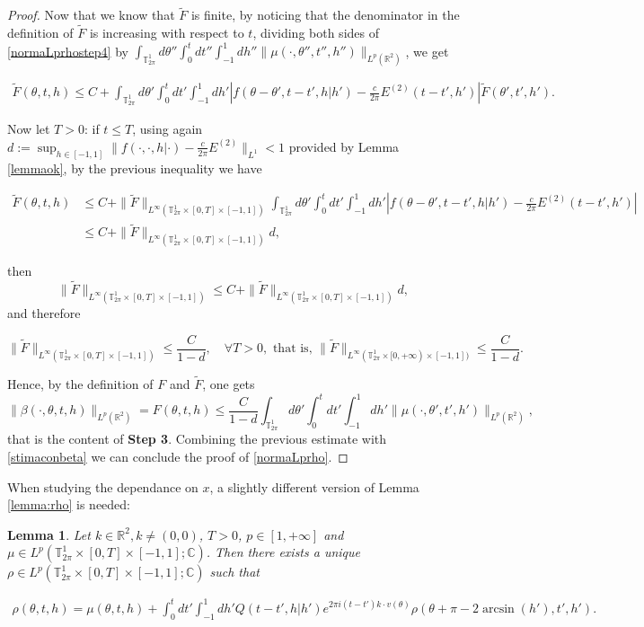\documentclass[a4paper,10pt,reqno]{amsart}
\newtheorem{lemma}{Lemma}[section]
\numberwithin{equation}{subsection}
\numberwithin{figure}{subsection}
\begin{document}
\begin{proof}
Now that we know that $\tilde F$ is finite, by noticing that the denominator in the definition of $\tilde F$ is increasing with respect to $t$, dividing both sides of \eqref{normaLprhostep4} by $\int_{\mathbb{T}^1_{2\pi}}d\theta''\int_0^tdt''\int_{-1}^1dh''\|\mu(\cdot,\theta'',t'',h'')\|_{L^p(\mathbb{R}^2)}$, we get

{\footnotesize\begin{align*}
\tilde F(\theta,t,h)\leq C+\int_{\mathbb{T}^1_{2\pi}}d\theta'\int_0^tdt'\int_{-1}^1dh' \left|f(\theta-\theta',t-t',h|h')-\frac{c}{2\pi}E^{(2)}(t-t',h')\right|\tilde F(\theta',t',h').
\end{align*}}

Now let $T>0$: if $t\leq T$, using again $d:=\sup_{h\in[-1,1]}\|f(\cdot,\cdot,h|\cdot)-\frac{c}{2\pi}E^{(2)}\|_{L^1}<1$ provided by Lemma \ref{lemmaok}, by the previous inequality we have

{\tiny\begin{align*}
\tilde F(\theta,t,h)&\leq C+\|\tilde F\|_{L^{\infty}(\mathbb{T}^1_{2\pi}\times[0,T]\times[-1,1])}\int_{\mathbb{T}^1_{2\pi}}d\theta'\int_0^tdt'\int_{-1}^1dh' \left|f(\theta-\theta',t-t',h|h')-\frac{c}{2\pi}E^{(2)}(t-t',h')\right|
\\
&\leq C+\|\tilde F\|_{L^{\infty}(\mathbb{T}^1_{2\pi}\times[0,T]\times[-1,1])}d,
\end{align*}}

then
\[
\|\tilde F\|_{L^{\infty}(\mathbb{T}^1_{2\pi}\times[0,T]\times[-1,1])}\leq C+\|\tilde F\|_{L^{\infty}(\mathbb{T}^1_{2\pi}\times[0,T]\times[-1,1])}d,
\]
and therefore

{\small\[
\|\tilde F\|_{L^{\infty}(\mathbb{T}^1_{2\pi}\times[0,T]\times[-1,1])}\leq\frac{C}{1-d},\quad\forall T>0,\textrm{ that is, }\|\tilde F\|_{L^{\infty}(\mathbb{T}^1_{2\pi}\times[0,+\infty)\times[-1,1])}\leq\frac{C}{1-d}.
\]}

Hence, by the definition of $F$ and $\tilde F$, one gets
\[
\|\beta(\cdot,\theta,t,h)\|_{L^p(\mathbb{R}^2)}=F(\theta,t,h)\leq\frac{C}{1-d}\int_{\mathbb{T}^1_{2\pi}}d\theta'\int_0^tdt'\int_{-1}^1dh'\|\mu(\cdot,\theta',t',h')\|_{L^p(\mathbb{R}^2)},
\]
that is the content of \textbf{Step 3}. Combining the previous estimate with \eqref{stimaconbeta} we can conclude the proof of \eqref{normaLprho}.
\end{proof}
When studying the dependance on $x$, a slightly different version of Lemma \ref{lemma:rho} is needed:
\begin{lemma}\label{lemma:rhovarianteC}
Let $k\in\mathbb{R}^2,k\neq(0,0)$, $T>0$, $p\in[1,+\infty]$ and $\mu\in L^p(\mathbb{T}^1_{2\pi}\times[0,T]\times[-1,1];\mathbb{C})$. Then there exists a unique $\rho\in L^p(\mathbb{T}^1_{2\pi}\times[0,T]\times[-1,1];\mathbb{C})$ such that

{\footnotesize\begin{align*}
\rho(\theta,t,h)=\mu(\theta,t,h)+\int_0^tdt'\int_{-1}^1dh'Q(t-t',h|h')e^{2\pi i(t-t')k\cdot v(\theta)}\rho(\theta+\pi-2\arcsin(h'),t',h').
\end{align*}}

\end{lemma}
\end{document}

